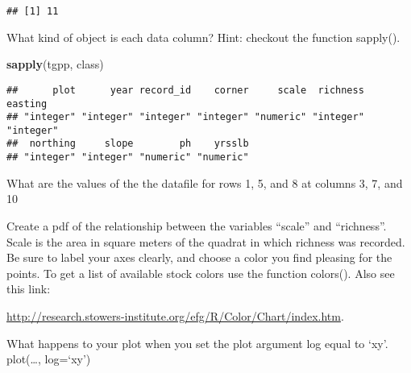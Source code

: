 \documentclass[]{article}
\newenvironment{Shaded}{\begin{snugshade}}{\end{snugshade}}
\newcommand{\KeywordTok}[1]{\textcolor[rgb]{0.13,0.29,0.53}{\textbf{#1}}}
\newcommand{\NormalTok}[1]{#1}
\begin{document}
\begin{verbatim}
## [1] 11
\end{verbatim}

What kind of object is each data column? Hint: checkout the function
sapply().

\begin{Shaded}
\begin{Highlighting}[]
\KeywordTok{sapply}\NormalTok{(tgpp, class)}
\end{Highlighting}
\end{Shaded}

\begin{verbatim}
##      plot      year record_id    corner     scale  richness   easting 
## "integer" "integer" "integer" "integer" "numeric" "integer" "integer" 
##  northing     slope        ph    yrsslb 
## "integer" "integer" "numeric" "numeric"
\end{verbatim}

What are the values of the the datafile for rows 1, 5, and 8 at columns
3, 7, and 10

Create a pdf of the relationship between the variables ``scale'' and
``richness''. Scale is the area in square meters of the quadrat in which
richness was recorded. Be sure to label your axes clearly, and choose a
color you find pleasing for the points. To get a list of available stock
colors use the function colors(). Also see this link:

\url{http://research.stowers-institute.org/efg/R/Color/Chart/index.htm}.

What happens to your plot when you set the plot argument log equal to
`xy'. plot(\ldots{}, log=`xy')
\end{document}
